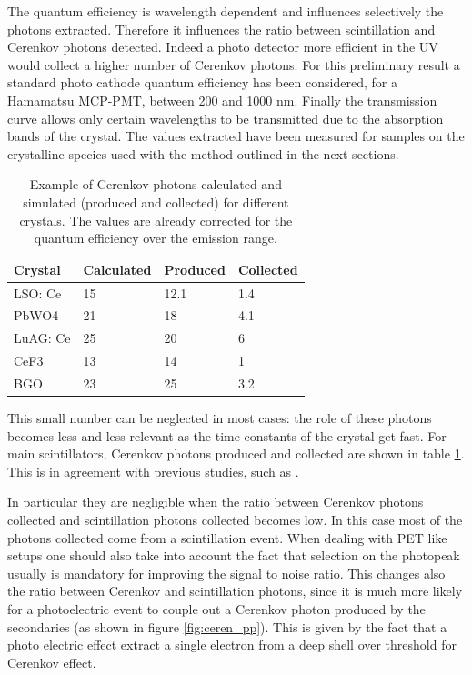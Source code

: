 The quantum efficiency is wavelength dependent and influences selectively the photons extracted. Therefore it influences the ratio between scintillation and Cerenkov photons detected. Indeed a photo detector more efficient in the UV would collect a higher number of Cerenkov photons. For this preliminary result a standard photo cathode quantum efficiency has been considered, for a Hamamatsu MCP-PMT, between 200 and 1000 nm.
Finally the transmission curve allows only certain wavelengths to be transmitted due to the absorption bands of the crystal. The values extracted have been measured for samples on the crystalline species used with the method outlined in the next sections.
\begin{table}[h]
\begin{center}
\begin{tabular}{|l|l|l|l|}
\hline
Crystal  & Calculated & Produced & Collected \\
\hline
LSO: Ce  & 15         & 12.1     & 1.4       \\
\hline
PbWO4    & 21         & 18       & 4.1       \\
\hline
LuAG: Ce & 25         & 20       & 6         \\
\hline
CeF3     & 13         & 14       & 1           \\
\hline
BGO      & 23         & 25       & 3.2     \\ 
\hline
\end{tabular}
\end{center}
\caption[Cerenkov photons produced in common crystals]{Example of Cerenkov photons calculated and simulated (produced and collected) for different crystals. The values are already corrected for the quantum efficiency over the emission range.}
\label{table:cer}
\end{table}
This small number can be neglected in most cases: the role of these photons becomes less and less relevant as the time constants of the crystal get fast. For main  scintillators, Cerenkov photons produced and collected are shown in table \ref{table:cer}. This is in agreement with previous studies, such as \cite{Brunner2014}.

In particular they are negligible when the ratio between Cerenkov photons collected and scintillation photons collected becomes low. In this case most of the photons collected come from a scintillation event.
When dealing with PET like setups one should also take into account the fact that selection on the photopeak usually is mandatory for improving the signal to noise ratio. This changes also the ratio between Cerenkov and scintillation photons, since it is much more likely for a photoelectric event to couple out a Cerenkov photon produced by the secondaries (as shown in figure \ref{fig:ceren_pp}). This is given by the fact that a photo electric effect extract a single electron from a deep shell over threshold for Cerenkov effect.

